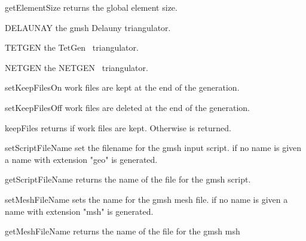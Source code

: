 \begin{methoddesc}[Design]{getElementSize}{}
returns the global element size.
\end{methoddesc}

\begin{memberdesc}[Design]{DELAUNAY}
the gmsh Delauny triangulator.
\end{memberdesc}

\begin{memberdesc}[Design]{TETGEN}
the TetGen~\cite{TETGEN} triangulator.
\end{memberdesc}

\begin{memberdesc}[Design]{NETGEN}
the NETGEN~\cite{NETGEN} triangulator.
\end{memberdesc}

\begin{methoddesc}[Design]{setKeepFilesOn}{}
work files are kept at the end of the generation.
\end{methoddesc}

\begin{methoddesc}[Design]{setKeepFilesOff}{}
work files are deleted at the end of the generation.
\end{methoddesc}

\begin{methoddesc}[Design]{keepFiles}{}
returns \True if work files are kept. Otherwise \False is returned.
\end{methoddesc}

\begin{methoddesc}[Design]{setScriptFileName}{}
set the filename for the gmsh input script. if no name is given a name with extension "geo" is generated.
\end{methoddesc}

\begin{methoddesc}[Design]{getScriptFileName}{}
returns the name of the file for the gmsh script.
\end{methoddesc}


\begin{methoddesc}[Design]{setMeshFileName}{}
sets the name for the gmsh  mesh file. if no name is given a name with extension "msh" is generated.
\end{methoddesc}

\begin{methoddesc}[Design]{getMeshFileName}{}
returns the name of the file for the gmsh msh
\end{methoddesc}


